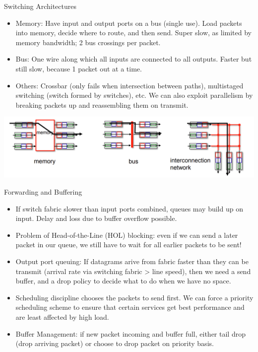 \documentclass{beamer}
\begin{document}
\begin{frame}[t]{Switching Architectures}
    \begin{itemize}
        \item \alert{Memory}: Have input and output ports on a bus (single use). Load packets into memory, decide where to route, and then send. Super slow, as limited by memory bandwidth; 2 bus crossings per packet.
        \pause\item \alert{Bus}: One wire along which all inputs are connected to all outputs. Faster but still slow, because 1 packet out at a time.
        \pause\item \alert{Others}: Crossbar (only fails when intersection between paths), multistaged switching (switch formed by switches), etc. We can also exploit parallelism by breaking packets up and reassembling them on transmit.
    \end{itemize}
    \begin{center}
        \includegraphics[width = .8\linewidth]{switching arches.png}
    \end{center}
\end{frame}

\begin{frame}[t]{Forwarding and Buffering}
    \begin{itemize}
        \item If switch fabric slower than input ports combined, queues may build up on input. Delay and loss due to buffer overflow possible. 
        \pause\item Problem of \alert{Head-of-the-Line} (HOL) blocking: even if we can send a later packet in our queue, we still have to wait for all earlier packets to be sent!
        \pause\item \alert{Output port queuing}: If datagrams arive from fabric faster than they can be transmit (arrival rate via switching fabric > line speed), then we need a send buffer, and a \alert{drop policy} to decide what to do when we have no space.
        \pause\item \alert{Scheduling discipline} chooses the packets to send first. We can force a priority scheduling scheme to ensure that certain services get best performance and are least affected by high load.
        \pause\item \alert{Buffer Management}: if new packet incoming and buffer full, either tail drop (drop arriving packet) or choose to drop packet on priority basis. 
    \end{itemize}
    
\end{frame}
\end{document}
